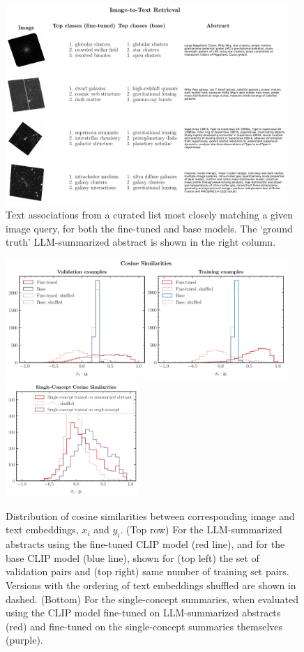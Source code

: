 \documentclass[10pt]{article} %
\begin{document}
\begin{figure}[!h]
\includegraphics[width=0.95\textwidth]{plots/itt.pdf}
\caption{Text associations from a curated list most closely matching a given image query, for both the fine-tuned and base models. The `ground truth' LLM-summarized abstract is shown in the right column.}
\label{fig:itt}
\end{figure}

\begin{figure}[!h]
\includegraphics[width=0.95\textwidth]{plots/sim_valtrain.pdf}
\centering\includegraphics[width=0.45\textwidth]{plots/sim_summ1.pdf}
\caption{Distribution of cosine similarities between corresponding image and text embeddings, $x_i$ and $y_i$. (Top row) For the LLM-summarized abstracts using the fine-tuned CLIP model (red line), and for the base CLIP model (blue line), shown for (top left) the set of validation pairs and (top right) same number of training set pairs. Versions with the ordering of text embeddings shuffled are shown in dashed. (Bottom) For the single-concept summaries, when evaluated using the CLIP model fine-tuned on LLM-summarized abstracts (red) and fine-tuned on the single-concept summaries themselves (purple).}
\label{fig:sim_valtrain}
\end{figure}
\end{document}
